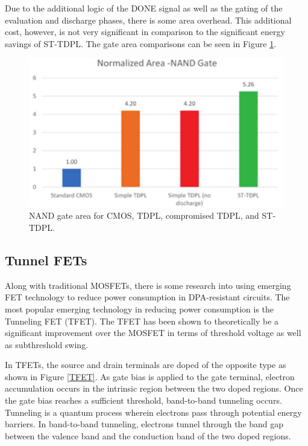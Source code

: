 \documentclass[conference, 12pt]{IEEEtran}
\newcommand{\x}{1}						%
\begin{document}
			Due to the additional logic of the DONE signal as well as the gating of the evaluation and discharge phases, there is some area overhead. This additional cost, however, is not very significant in comparison to the significant energy savings of ST-TDPL. The gate area comparisons can be seen in Figure \ref{ST-TDPL_Area}.

			\begin{figure}[tbp]
				\centering
				\includegraphics[width=\x\linewidth]{ReportFiles/ST-TDPL_Area.png}
				\caption{NAND gate area for CMOS, TDPL, compromised TDPL, and ST-TDPL.\cite{b2}}
				\label{ST-TDPL_Area}
			\end{figure}

		\subsection{Tunnel FETs}
			Along with traditional MOSFETs, there is some research into using emerging FET technology to reduce power consumption in DPA-resistant circuits. The most popular emerging technology in reducing power consumption is the Tunneling FET (TFET). The TFET has been shown to theoretically be a significant improvement over the MOSFET in terms of threshold voltage as well as subthreshold swing.

			In TFETs, the source and drain terminals are doped of the opposite type as shown in Figure \ref{TFET}. As gate bias is applied to the gate terminal, electron accumulation occurs in the intrinsic region between the two doped regions. Once the gate bias reaches a sufficient threshold, band-to-band tunneling occurs. Tunneling is a quantum process wherein electrons pass through potential energy barriers. In band-to-band tunneling, electrons tunnel through the band gap between the valence band and the conduction band of the two doped regions. 
\end{document}
